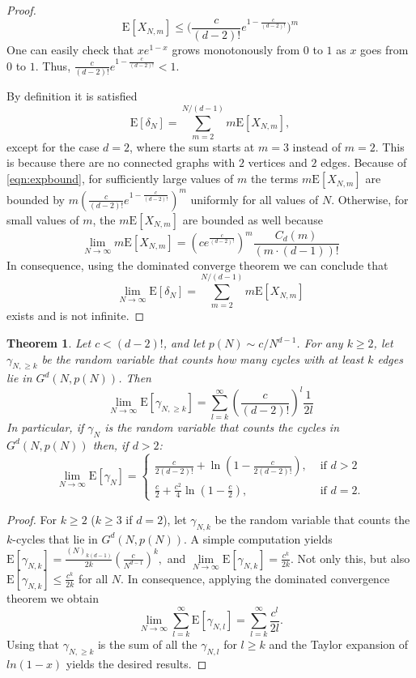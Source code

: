 \documentclass[11pt,notitlepage,a4paper]{article}
\newtheorem{theorem}{Theorem}[section]
\theoremstyle{definition}
\newcommand{\LN}{\lim\limits_{N\to \infty}}
\begin{document}
\begin{proof}
	\begin{equation}
	\label{eqn:expbound}
		\mathrm{E}[X_{N,m}]\leq \Bigg(\frac{c}{(d-2)!}
		e^{1-\frac{c}{(d-2)!}} \Bigg)^m
	\end{equation}
	One can easily check that $xe^{1-x}$ grows monotonously from $0$
	to $1$ as $x$ goes from $0$ to $1$. Thus, $\frac{c}{(d-2)!}
	e^{1-\frac{c}{(d-2)!}}<1$.\par
	By definition it is satisfied
	\[
	\mathrm{E}[\delta_N]=\sum_{m=2}^{N/(d-1)}	m \mathrm{E}[X_{N,m}],
	\]
	except for the case $d=2$, where the sum starts at $m=3$ instead of $m=2$.
	This is because there are no connected graphs with $2$ vertices and $2$ edges. 
	Because of \cref{eqn:expbound}, for sufficiently large values of $m$ the terms
	$m\mathrm{E}[X_{N,m}]$ are bounded by
	$m(\frac{c}{(d-2)!}e^{1-\frac{c}{(d-2)!}})^m$ uniformly for all values of $N$. 
	Otherwise, for small values of $m$, the $m\mathrm{E}[X_{N,m}]$ are bounded as
	well because
	\[
	\LN m\mathrm{E}[X_{N,m}]= \left(ce^{\frac{c}{(d-2)!}}\right)^m\frac{C_d(m)}{(m\cdot(d-1))!}
	\]
	In consequence, using the dominated converge theorem we can conclude that
	\[
	\LN \mathrm{E}[\delta_N]=\sum_{m=2}^{N/(d-1)}	m \mathrm{E}[X_{N,m}]
	\]
	exists and is not infinite. 
	\end{proof}
	
	\begin{theorem} \label{thm:expectedcycles}
		Let $c< (d-2)!$, and let $p(N)\sim c/N^{d-1}$. For any $k\geq 2$, let  $\gamma_{N,\geq k}$ be the random variable that counts how many 
		cycles with at least $k$ edges lie in $G^d(N,p(N))$. Then
		\[
		\LN \mathrm{E}[\gamma_{N,\geq k}]=\sum_{l=k}^{\infty} 
		\left(\frac{c}{(d-2)!}\right)^l \frac{1}{2l}
		\] 	
		In particular, if $\gamma_N$ is the random variable that counts the cycles
		in $G^d(N,p(N))$ then, if $d>2$:
		\[
		\LN \mathrm{E}[\gamma_{N}]	= 
		\begin{cases}
		\frac{c}{2(d-2)!}+ \ln\left(1-\frac{c}{2(d-2)!}\right), &  
		\text{ if } d>2\\
		\frac{c}{2}+ \frac{c^2}{4} 
		\ln\left(1-\frac{c}{2}\right), &
		\text{ if } d=2.
		\end{cases}
		\]
	\end{theorem}
	\begin{proof}
		For $k\geq 2$ ($k\geq 3$ if $d=2$), let $\gamma_{N,k}$ be the random
		variable that counts
		the $k$-cycles that lie in $G^d(N,p(N))$.
		A simple computation yields
		$
		\mathrm{E}[\gamma_{N,k}]= \frac{(N)_{k(d-1)}}{2k}
		\left(\frac{c}{N^{d-1}}\right)^k,$
		and
		$
		\LN	\mathrm{E}[\gamma_{N,k}]= \frac{c^k}{2k}
		$.
		Not only this, but also
		$
		\mathrm{E}[\gamma_{N,k}]\leq \frac{c^k}{2k}$
		for all $N$. In consequence, applying the dominated convergence
		theorem we obtain
		\[ 
		\LN \sum_{l=k}^\infty \mathrm{E}[\gamma_{N,l}]=
		 \sum_{l=k}^\infty \frac{c^l}{2l}.
		\]
		Using that $\gamma_{N,\geq k}$ is the sum of all the $\gamma_{N,l}$
		for $l\geq k$ and the Taylor expansion of $ln(1-x)$ yields the desired
		results. 
	\end{proof}
	
\end{document}
